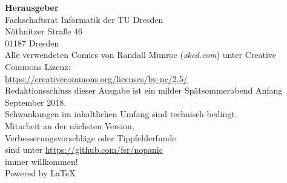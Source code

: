 \newpage
\thispagestyle{empty} %
\color{white}

\begin{minipage}[t][\textheight][b]{.60\textwidth}
\footnotesize
\textbf{Herausgeber} \\
Fachschaftsrat Informatik der TU Dresden\\
Nöthnitzer Straße 46\\
01187 Dresden\\[1\baselineskip]

Alle verwendeten Comics von Randall Munroe (\textit{xkcd.com}) unter Creative Commons Lizenz:\\
\url{https://creativecommons.org/licenses/by-nc/2.5/}\\[1\baselineskip]

Redaktionsschluss dieser Ausgabe ist ein milder Spätsommerabend Anfang September 2018.\\%
Schwankungen im inhaltlichen Umfang sind technisch bedingt.\\[1\baselineskip]

Mitarbeit an der nächsten Version,\\
Verbesserungsvorschläge oder Tippfehlerfunde\\
sind unter \url{https://github.com/fsr/nopanic}\\
immer willkommen!\\[1\baselineskip]

Powered by \LaTeX
\end{minipage}%
\hspace{.20\textwidth}%
